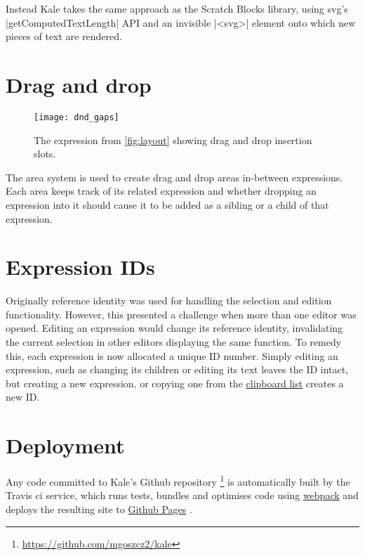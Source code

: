 Instead Kale takes the same approach as the Scratch Blocks \cite{ScratchBlocks}
library, using \ac{svg}'s |getComputedTextLength| API and an invisible
|<svg>| element onto which new pieces of text are rendered. 



\section{Drag and drop}
\label{impl:dnd}
\begin{wrapfigure}[10]{r}{0pt}
\texttt{[image: dnd\_gaps]}
\caption{The expression from \autoref{fig:layout} showing drag and drop
insertion slots.}
\end{wrapfigure}
The area system is used to create drag and drop areas in-between expressions.
Each area keeps track of its related expression and whether dropping an
expression into it should cause it to be added as a sibling or a child
of that expression.


\section{Expression IDs}
Originally reference identity was used for handling the selection and edition
functionality. However, this presented a challenge when more than one editor
was opened. Editing an expression would change its reference identity,
invalidating the current selection in other editors displaying the same
function. To remedy this, each expression is now allocated a unique ID number.
Simply editing an expression, such as changing its children or editing its text
leaves the ID intact, but creating a new expression, or copying one from the
\hyperref[soln:clipboard_list]{clipboard list} creates a new ID.



%




\section{Deployment}
Any code committed to Kale's Github repository%
\footnote{\url{https://github.com/mgoszcz2/kale}}
is automatically built by the Travis \ac{ci} service, which runs tests, bundles
and optimises code using
\href{https://webpack.js.org/}{webpack}
and deploys the resulting site to
\href{https://pages.github.com/}{Github Pages}%
.
